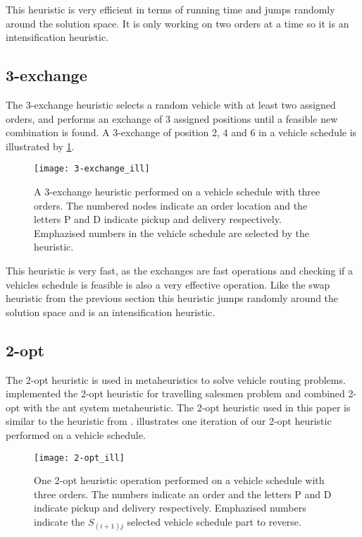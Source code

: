 \documentclass[../main.tex]{subfiles}
\begin{document}
This heuristic is very efficient in terms of running time and jumps randomly around the solution space. It is only working on two orders at a time so it is an intensification heuristic.

\subsection{3-exchange}
\label{sec:exch}
The 3-exchange heuristic selects a random vehicle with at least two assigned orders, and performs an exchange of 3 assigned positions until a feasible new combination is found. A 3-exchange of position 2, 4 and 6 in a vehicle schedule is illustrated by \cref{fig:exch}. \newline

\begin{figure}                                                                                     
    \centering                                                                                     
    \texttt{[image: 3-exchange\_ill]}                                     
    \caption{A 3-exchange heuristic performed on a vehicle schedule with three orders. The numbered nodes indicate an order location and the letters P and D indicate pickup and delivery respectively. Emphazised numbers in the vehicle schedule are selected by the heuristic.}
    \label{fig:exch}                                                                            
\end{figure}

This heuristic is very fast, as the exchanges are fast operations and checking if a vehicles schedule is feasible is also a very effective operation. Like the swap heuristic from the previous section this heuristic jumps randomly around the solution space and is an intensification heuristic.

\subsection{2-opt}
\label{sec:2opt}
The 2-opt heuristic is used in metaheuristics to solve vehicle routing problems. \cite{lin65} implemented the 2-opt heuristic for travelling salesmen problem and \cite{bullnheimer99} combined 2-opt with the ant system metaheuristic.
The 2-opt heuristic used in this paper is similar to the heuristic from \cite{carrabs07}.
 illustrates one iteration of our 2-opt heuristic performed on a vehicle schedule.

\begin{figure}                                                                                     
    \centering                                                                                 
    \texttt{[image: 2-opt\_ill]}                                     
    \caption{One 2-opt heuristic operation performed on a vehicle schedule with three orders. The numbers indicate an order and the letters P and D indicate pickup and delivery respectively. Emphazised numbers indicate the $S_{(i+1)j}$ selected vehicle schedule part to reverse.}
    \label{fig:2opt}
\end{figure}
\end{document}

